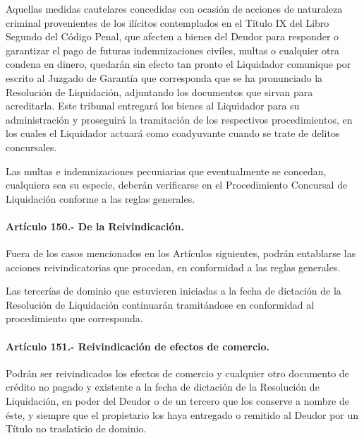 \documentclass[
]{book}
\begin{document}
Aquellas medidas cautelares concedidas con ocasión de acciones de naturaleza criminal provenientes de los ilícitos contemplados en el Título IX del Libro Segundo del Código Penal, que afecten a bienes del Deudor para responder o garantizar el pago de futuras indemnizaciones civiles, multas o cualquier otra condena en dinero, quedarán sin efecto tan pronto el Liquidador comunique por escrito al Juzgado de Garantía que corresponda que se ha pronunciado la Resolución de Liquidación, adjuntando los documentos que sirvan para acreditarla. Este tribunal entregará los bienes al Liquidador para su administración y proseguirá la tramitación de los respectivos procedimientos, en los cuales el Liquidador actuará como coadyuvante cuando se trate de delitos concursales.

Las multas e indemnizaciones pecuniarias que eventualmente se concedan, cualquiera sea su especie, deberán verificarse en el Procedimiento Concursal de Liquidación conforme a las reglas generales.

\hypertarget{artuxedculo-150.--de-la-reivindicaciuxf3n.}{%
\paragraph*{Artículo 150.- De la Reivindicación.}\label{artuxedculo-150.--de-la-reivindicaciuxf3n.}}

Fuera de los casos mencionados en los Artículos siguientes, podrán entablarse las acciones reivindicatorias que procedan, en conformidad a las reglas generales.

Las tercerías de dominio que estuvieren iniciadas a la fecha de dictación de la Resolución de Liquidación continuarán tramitándose en conformidad al procedimiento que corresponda.

\hypertarget{artuxedculo-151.--reivindicaciuxf3n-de-efectos-de-comercio.}{%
\paragraph*{Artículo 151.- Reivindicación de efectos de comercio.}\label{artuxedculo-151.--reivindicaciuxf3n-de-efectos-de-comercio.}}

Podrán ser reivindicados los efectos de comercio y cualquier otro documento de crédito no pagado y existente a la fecha de dictación de la Resolución de Liquidación, en poder del Deudor o de un tercero que los conserve a nombre de éste, y siempre que el propietario los haya entregado o remitido al Deudor por un Título no traslaticio de dominio.
\end{document}
